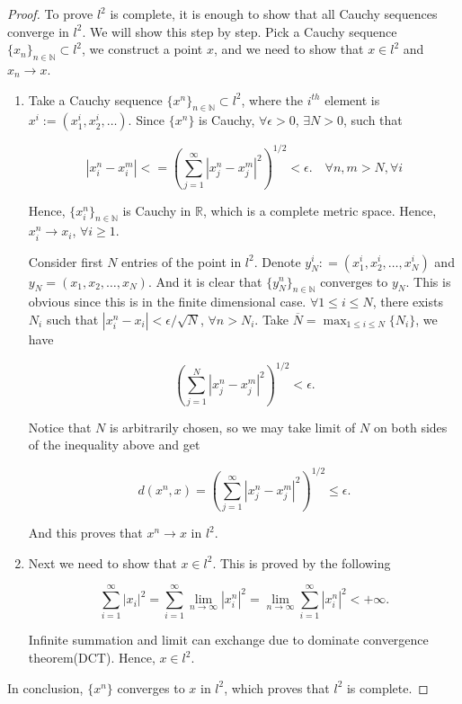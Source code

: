 \documentclass[12pt]{article}
\begin{document}
\begin{proof}

To prove $l^2$ is complete, it is enough to show that all Cauchy sequences converge in $l^2$. We will show this step by step. Pick a Cauchy sequence $\{x_n\}_{n\in\mathbb N}\subset l^2$, we construct a point $x$, and we need to show that $x\in l^2$ and $x_n\rightarrow x$.

\begin{enumerate}
\item

Take a Cauchy sequence $\{x^n\}_{n\in\mathbb N} \subset l^2$, where the $i^{th}$ element is $x^i := (x_1^i, x_2^i, \dots)$. Since $\{x^n\}$ is Cauchy, $\forall \epsilon > 0$, $\exists N > 0$, such that 

$$
|x_i^n - x_i^m| <= \left( \sum^{\infty}_{j=1} |x^n_j - x^m_j|^2\right)^{1/2} < \epsilon. \quad \forall n,m > N, \forall i
$$

Hence, $\{x_i^n\}_{n\in\mathbb N}$ is Cauchy in $\mathbb R$, which is a complete metric space. Hence, $x_i^n \rightarrow x_i$, $\forall i \geqslant 1$.

Consider first $N$ entries of the point in $l^2$. Denote $y^i_N : = (x_1^i, x_2^i, \dots, x_N^i)$ and $y_N = (x_1, x_2, \dots, x_N)$. And it is clear that $\{y^n_N\}_{n\in\mathbb N}$ converges to $y_N$. This is obvious since this is in the finite dimensional case. $\forall 1\leqslant i\leqslant N$, there exists $N_i$ such that $|x_i^n - x_i| < \epsilon / \sqrt{N}$, $\forall n > N_i$. Take $\overline N = \max_{1\leqslant i \leqslant N}\{N_i\}$, we have 

$$
\left( \sum^{N}_{j=1} |x^n_j - x^m_j|^2\right)^{1/2} < \epsilon.
$$

Notice that $N$ is arbitrarily chosen, so we may take limit of $N$ on both sides of the inequality above and get

$$
d(x^n, x) = \left( \sum^{\infty}_{j=1} |x^n_j - x^m_j|^2\right)^{1/2} \leqslant \epsilon.
$$

And this proves that $x^n\rightarrow x$ in $l^2$. 

\item

Next we need to show that $x \in l^2$. This is proved by the following

$$
\sum_{i = 1}^\infty |x_i|^2 = \sum_{i = 1}^\infty \lim_{n\rightarrow\infty}|x_i^n|^2 = \lim_{n\rightarrow\infty}\sum_{i = 1}^\infty |x_i^n|^2 < +\infty.
$$

Infinite summation and limit can exchange due to dominate convergence theorem(DCT). Hence, $x\in l^2$.

\end{enumerate}

In conclusion, $\{x^n\}$ converges to $x$ in $l^2$, which proves that $l^2$ is complete.

\end{proof}
\end{document}
